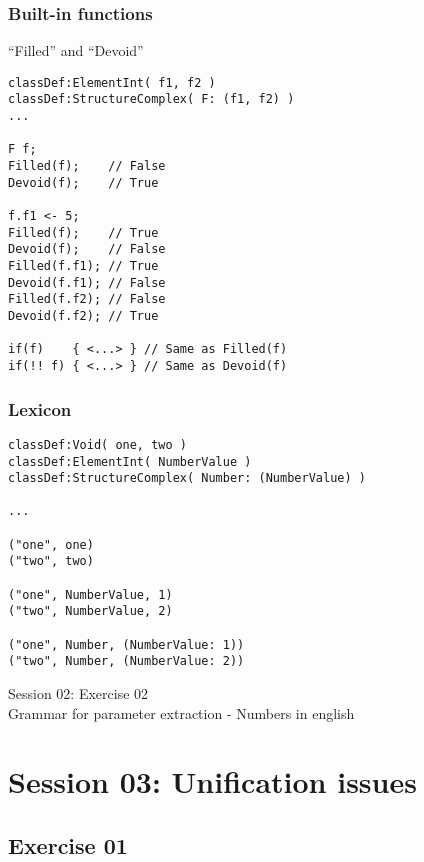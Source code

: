 \documentclass[11pt]{beamer}
\begin{document}
\begin{frame}[fragile]
\frametitle{Built-in functions}
\begin{block}{``Filled'' and ``Devoid''}
\scriptsize
\begin{lstlisting}[language=lekta]
classDef:ElementInt( f1, f2 )
classDef:StructureComplex( F: (f1, f2) )
...

F f;
Filled(f);    // False
Devoid(f);    // True

f.f1 <- 5;
Filled(f);    // True
Devoid(f);    // False
Filled(f.f1); // True
Devoid(f.f1); // False
Filled(f.f2); // False
Devoid(f.f2); // True

if(f)    { <...> } // Same as Filled(f)
if(!! f) { <...> } // Same as Devoid(f)
\end{lstlisting}
\end{block}
\end{frame}
\footnotesize
\begin{frame}[fragile]
\frametitle{Lexicon}
\begin{lstlisting}[language=lekta]
classDef:Void( one, two )
classDef:ElementInt( NumberValue )
classDef:StructureComplex( Number: (NumberValue) )

...

("one", one)
("two", two)

("one", NumberValue, 1)
("two", NumberValue, 2)

("one", Number, (NumberValue: 1))
("two", Number, (NumberValue: 2))
\end{lstlisting}
\end{frame}

\begin{frame}[fragile]
\Huge
\begin{center}
Session 02: Exercise 02\\
Grammar for parameter extraction - Numbers in english
\end{center}
\end{frame}

\section{Session 03: Unification issues}

\subsection{Exercise 01}
\end{document}
